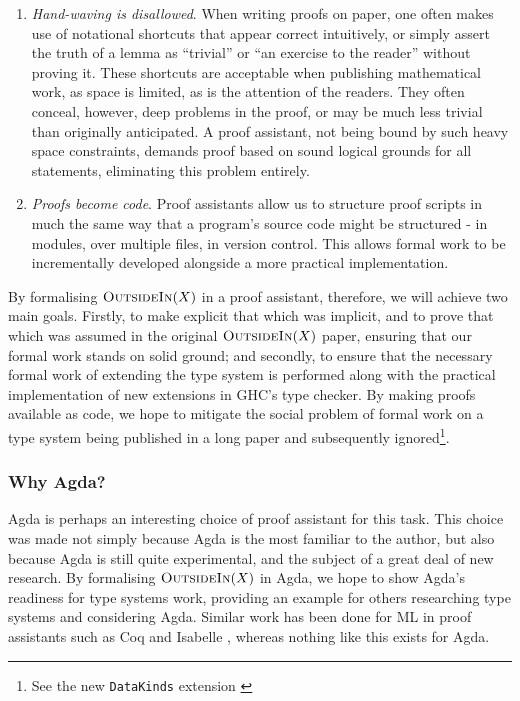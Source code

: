 \documentclass[a4paper]{jfp}
\newcommand{\outsidein}{\textsc{OutsideIn}(X)}
\begin{document}
\begin{enumerate}
	\item \emph{Hand-waving is disallowed}. When writing proofs on paper, one often makes use of notational shortcuts that appear correct intuitively, or simply assert the truth of a lemma as ``trivial'' or ``an exercise to the reader'' without proving it. These shortcuts are acceptable when publishing mathematical work, as space is limited, as is the attention of the readers. They often conceal, however, deep problems in the proof, or may be much less trivial than originally anticipated. A proof assistant, not being bound by such heavy space constraints, demands proof based on sound logical grounds for all statements, eliminating this problem entirely. 
	\item \emph{Proofs become code}. Proof assistants allow us to structure proof scripts in much the same way that a program's source code might be structured - in modules, over multiple files, in version control. This allows formal work to be incrementally developed alongside a more practical implementation.	
\end{enumerate}	

By formalising $\outsidein$ in a proof assistant, therefore, we will achieve two main goals. Firstly, to make explicit that which was implicit, and to prove that which was assumed in the original $\outsidein$ paper, ensuring that our formal work stands on solid ground; and secondly, to ensure that the necessary formal work of extending the type system is performed along with the practical implementation of new extensions in GHC's type checker. By making proofs available as code, we hope to mitigate the social problem of formal work on a type system being published in a long paper and subsequently ignored\footnote{See the new {\tt DataKinds} extension \cite{Yorgey:2012:GHP:2103786.2103795} }. 

\subsubsection{Why Agda?}

Agda is perhaps an interesting choice of proof assistant for this task. This choice was made not simply because Agda is the most familiar to the author, but also because Agda is still quite experimental, and the subject of a great deal of new research. By formalising $\outsidein$ in Agda, we hope to show Agda's readiness for type systems work, providing an example for others researching type systems and considering Agda. Similar work has been done for ML in proof assistants such as Coq \cite{Dubois00provingml} and Isabelle \cite{Naraschewski:1999:TIV:594135.594270}, whereas nothing like this exists for Agda. 
\end{document}
